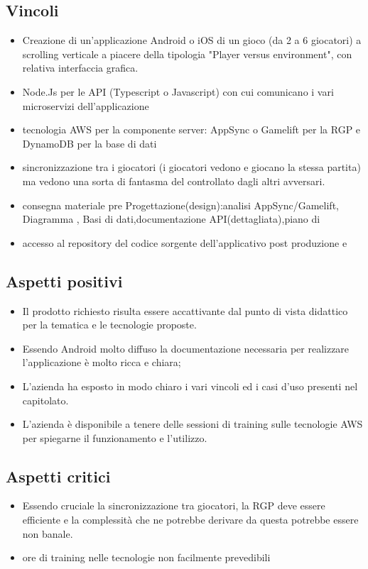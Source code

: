 \subsection{Vincoli}
\begin{itemize}
\item Creazione di un'applicazione Android o iOS di un gioco (da 2 a 6 giocatori) a scrolling verticale a piacere della tipologia "Player versus environment", con relativa interfaccia grafica.
\item Node.Js per le API (Typescript o Javascript) con cui comunicano i vari microservizi dell'applicazione
\item tecnologia AWS per la componente server: AppSync o Gamelift per la RGP e DynamoDB per la base di dati    
\item sincronizzazione  tra i giocatori (i giocatori vedono e giocano la stessa partita) ma vedono una sorta di fantasma del  controllato dagli altri avversari.
\item consegna materiale pre Progettazione(design):analisi AppSync/Gamelift, Diagramma  , Basi di dati,documentazione API(dettagliata),piano di 
\item accesso al repository del codice sorgente dell'applicativo post produzione e  
\end{itemize}

\subsection{Aspetti positivi}
\begin{itemize}
\item Il prodotto richiesto risulta essere accattivante dal punto di vista didattico per la tematica e le tecnologie proposte.
\item Essendo Android molto diffuso la documentazione necessaria per realizzare l'applicazione è molto ricca e chiara;
\item L'azienda ha esposto in modo chiaro i vari vincoli ed i casi d'uso presenti nel capitolato.
\item L'azienda \`e disponibile a tenere delle sessioni di training sulle tecnologie AWS per spiegarne il funzionamento e l'utilizzo.
\end{itemize}
\subsection{Aspetti critici}
\begin{itemize}
\item Essendo cruciale la sincronizzazione tra giocatori, la RGP deve essere efficiente e la complessità che ne potrebbe derivare da questa potrebbe essere non banale.
\item ore di training nelle tecnologie non facilmente prevedibili
\end{itemize}

